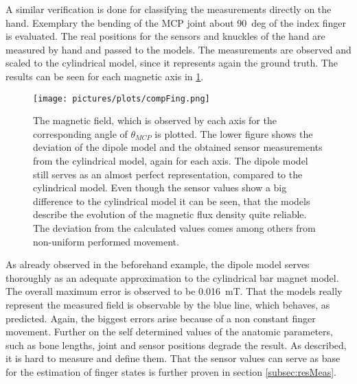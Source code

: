 A similar verification is done for classifying the measurements directly on the hand. Exemplary the bending of the \ac{MCP} joint about \SI{90}{deg} of the index finger is evaluated. The real positions for the sensors and knuckles of the hand are measured by hand and passed to the models. The measurements are observed and scaled to the cylindrical model, since it represents again the ground truth. The results can be seen for each magnetic axis in \ref{fig:modCompHand}.
\begin{figure}[!htb]
\centering
\texttt{[image: pictures/plots/compFing.png]}
\caption[Comparing the models and sensor measurements for finger movement]
{The magnetic field, which is observed by each axis for the corresponding angle of $ \theta_{MCP} $ is plotted. The lower figure shows the deviation of the dipole model and the obtained sensor measurements from the cylindrical model, again for each axis. The dipole model still serves as an almost perfect representation, compared to the cylindrical model. Even though the sensor values show a big difference to the cylindrical model it can be seen, that the models describe the evolution of the magnetic flux density quite reliable. The deviation from the calculated values comes among others from non-uniform performed movement.}
\label{fig:modCompHand}
\end{figure}
As already observed in the beforehand example, the dipole model serves thoroughly as an adequate approximation to the cylindrical bar magnet model. The overall maximum error is observed to be \SI{0.016}{\milli \tesla}. That the models really represent the measured field is observable by the blue line, which behaves, as predicted. Again, the biggest errors arise because of a non constant finger movement. Further on the self determined values of the anatomic parameters, such as bone lengths, joint and sensor positions degrade the result. As described, it is hard to measure and define them. That the sensor values can serve as base for the estimation of finger states is further proven in section \ref{subsec:resMeas}.


